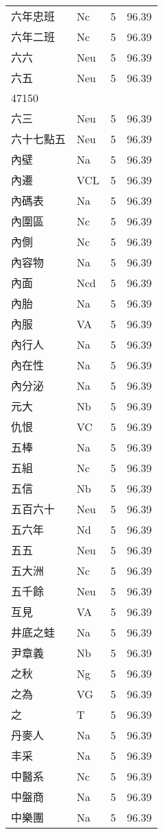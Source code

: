 \documentclass[twocolumn]{book}
\begin{document}
\begin{supertabular}{llrr}
六年忠班 & Nc & 5 &  96.39\\
六年二班 & Nc & 5 &  96.39\\
六六 & Neu & 5 &  96.39\\
六五 & Neu & 5 &  96.39\\
47150\\
六三 & Neu & 5 &  96.39\\
六十七點五 & Neu & 5 &  96.39\\
內壁 & Na & 5 &  96.39\\
內遷 & VCL & 5 &  96.39\\
內碼表 & Na & 5 &  96.39\\
內圍區 & Nc & 5 &  96.39\\
內側 & Nc & 5 &  96.39\\
內容物 & Na & 5 &  96.39\\
內面 & Ncd & 5 &  96.39\\
內胎 & Na & 5 &  96.39\\
內服 & VA & 5 &  96.39\\
內行人 & Na & 5 &  96.39\\
內在性 & Na & 5 &  96.39\\
內分泌 & Na & 5 &  96.39\\
元大 & Nb & 5 &  96.39\\
仇恨 & VC & 5 &  96.39\\
五棒 & Na & 5 &  96.39\\
五組 & Nc & 5 &  96.39\\
五信 & Nb & 5 &  96.39\\
五百六十 & Neu & 5 &  96.39\\
五六年 & Nd & 5 &  96.39\\
五五 & Neu & 5 &  96.39\\
五大洲 & Nc & 5 &  96.39\\
五千餘 & Neu & 5 &  96.39\\
互見 & VA & 5 &  96.39\\
井底之蛙 & Na & 5 &  96.39\\
尹章義 & Nb & 5 &  96.39\\
之秋 & Ng & 5 &  96.39\\
之為 & VG & 5 &  96.39\\
之 & T & 5 &  96.39\\
丹麥人 & Na & 5 &  96.39\\
丰采 & Na & 5 &  96.39\\
中醫系 & Nc & 5 &  96.39\\
中盤商 & Na & 5 &  96.39\\
中樂團 & Na & 5 &  96.39\\

\end{supertabular}
\end{document}
